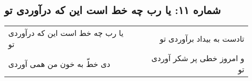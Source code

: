 \begin{center}
\section*{شماره ۱۱: یا رب چه خط است این که درآوردی تو}
\label{sec:011}
\begin{longtable}{l p{0.5cm} r}
یا رب چه خط است این که درآوردی تو
&&
تادست به بیداد برآوردی تو
\\
دی خطّ به خون من همی آوردی
&&
و امروز خطی پر شکر آوردی تو
\\
\end{longtable}
\end{center}
